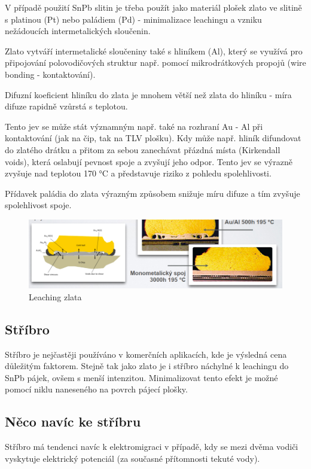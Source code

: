V případě použití SnPb slitin je třeba použít jako materiál plošek zlato ve slitině s platinou (Pt) nebo paládiem (Pd) - minimalizace leachingu a vzniku nežádoucích intermetalických
sloučenin.

Zlato vytváří intermetalické sloučeniny také s hliníkem (Al), který se využívá pro připojování polovodičových struktur např. pomocí mikrodrátkových propojů (wire bonding -
kontaktování).

Difuzní koeficient hliníku do zlata je mnohem větší než zlata do hliníku - míra difuze rapidně
vzůrstá s teplotou.

Tento jev se může stát významným např. také na rozhraní Au - Al při kontaktování (jak na
čip, tak na TLV plošku). Kdy může např. hliník difundovat do zlatého drátku a přitom za
sebou zanechávat přázdná místa (Kirkendall voids), která oslabují pevnost spoje a zvyšují jeho odpor. Tento jev se výrazně zvyšuje nad teplotou 170 °C a představuje riziko z pohledu
spolehlivosti.

Přídavek paládia do zlata výrazným způsobem snižuje míru difuze a tím zvyšuje spolehlivost
spoje.

\begin{figure}[h]
   \begin{center}
     \includegraphics[scale=0.6]{images/Leach.png}
   \end{center}
   \caption{Leaching zlata}
\end{figure}

\subsection{Stříbro}
Stříbro je nejčastěji používáno v komerčních aplikacích, kde je výsledná cena důležitým faktorem. Stejně tak jako zlato je i stříbro náchylné k leachingu do SnPb pájek, ovšem s menší intenzitou. Minimalizovat tento efekt je možné pomocí niklu naneseného na povrch pájecí plošky.

\subsection{Něco navíc ke stříbru}
Stříbro má tendenci navíc k elektromigraci v případě, kdy se mezi dvěma vodiči vyskytuje elektrický potenciál (za současné přítomnosti tekuté vody).

